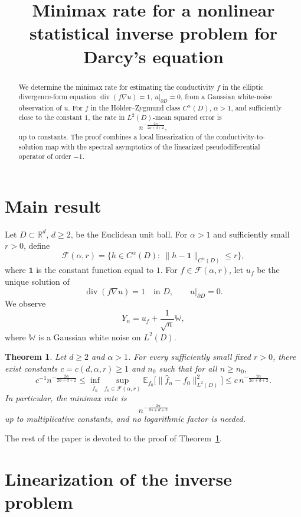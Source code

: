 \documentclass[11pt]{article}
\title{Minimax rate for a nonlinear statistical inverse problem for Darcy's equation}
\author{}
\date{}
\newcommand{\R}{\mathbb{R}}
\newcommand{\E}{\mathbb{E}}
\newcommand{\one}{\mathbf{1}}
\newtheorem{theorem}{Theorem}
\theoremstyle{remark}
\begin{document}
\maketitle

\begin{abstract}
We determine the minimax rate for estimating the conductivity \(f\) in the elliptic divergence-form equation
\(\operatorname{div}(f\nabla u)=1\), \(u|_{\partial D}=0\), from a Gaussian white-noise observation of \(u\). 
For \(f\) in the Hölder--Zygmund class \(C^\alpha(D)\), \(\alpha>1\), and sufficiently close to the constant \(1\), the rate in \(L^2(D)\)-mean squared error is
\[
n^{-\frac{2\alpha}{2\alpha+d+2}},
\]
up to constants. The proof combines a local linearization of the conductivity-to-solution map with the spectral asymptotics of the linearized pseudodifferential operator of order \(-1\).
\end{abstract}

\section{Main result}

Let \(D\subset\R^d\), \(d\ge2\), be the Euclidean unit ball. For \(\alpha>1\) and sufficiently small \(r>0\), define
\[
\mathcal F(\alpha,r)=\{h\in C^\alpha(D):\ \|h-\one\|_{C^\alpha(D)}\le r\},
\]
where \(\one\) is the constant function equal to \(1\). For \(f\in\mathcal F(\alpha,r)\), let \(u_f\) be the unique solution of
\[
\operatorname{div}(f\nabla u)=1\quad\text{in }D,\qquad u|_{\partial D}=0.
\]
We observe
\[
Y_n=u_f+\frac1{\sqrt n}\mathbb W,
\]
where \(\mathbb W\) is a Gaussian white noise on \(L^2(D)\).

\begin{theorem}\label{thm:main}
Let \(d\ge2\) and \(\alpha>1\). For every sufficiently small fixed \(r>0\), there exist constants \(c=c(d,\alpha,r)\ge1\) and \(n_0\) such that for all \(n\ge n_0\),
\[
c^{-1}n^{-\frac{2\alpha}{2\alpha+d+2}}
\le
\inf_{\hat f_n}\sup_{f_0\in\mathcal F(\alpha,r)}
\E_{f_0}\bigl[\|\hat f_n-f_0\|_{L^2(D)}^2\bigr]
\le
c\,n^{-\frac{2\alpha}{2\alpha+d+2}}.
\]
In particular, the minimax rate is
\[
n^{-\frac{2\alpha}{2\alpha+d+2}}
\]
up to multiplicative constants, and no logarithmic factor is needed.
\end{theorem}

The rest of the paper is devoted to the proof of Theorem~\ref{thm:main}.

\section{Linearization of the inverse problem}
\end{document}
